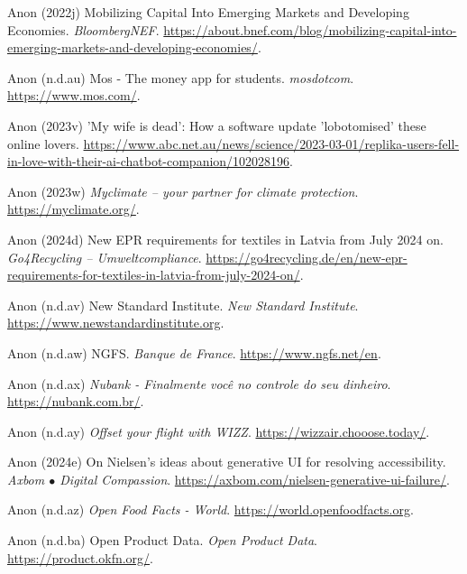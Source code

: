 \documentclass[
  letterpaper,
  DIV=11,
  numbers=noendperiod]{scrartcl}
\newlength{\cslhangindent}
\newenvironment{CSLReferences}[2] %
 {\begin{list}{}{%
  \setlength{\itemindent}{0pt}
  \setlength{\leftmargin}{0pt}
  \setlength{\parsep}{0pt}
  \ifodd #1
   \setlength{\leftmargin}{\cslhangindent}
   \setlength{\itemindent}{-1\cslhangindent}
  \fi
  \setlength{\itemsep}{#2\baselineskip}}}
 {\end{list}}
\begin{document}
\begin{CSLReferences}{0}{1}
Anon (2022j) Mobilizing {Capital Into Emerging Markets} and {Developing
Economies}. \emph{BloombergNEF}.
\url{https://about.bnef.com/blog/mobilizing-capital-into-emerging-markets-and-developing-economies/}.

Anon (n.d.au) Mos - {The} money app for students. \emph{mosdotcom}.
\url{https://www.mos.com/}.

Anon (2023v) '{My} wife is dead': {How} a software update 'lobotomised'
these online lovers.
\url{https://www.abc.net.au/news/science/2023-03-01/replika-users-fell-in-love-with-their-ai-chatbot-companion/102028196}.

Anon (2023w) \emph{Myclimate -- your partner for climate protection}.
\url{https://myclimate.org/}.

Anon (2024d) New {EPR} requirements for textiles in {Latvia} from {July}
2024 on. \emph{Go4Recycling -- Umweltcompliance}.
\url{https://go4recycling.de/en/new-epr-requirements-for-textiles-in-latvia-from-july-2024-on/}.

Anon (n.d.av) New {Standard Institute}. \emph{New Standard Institute}.
\url{https://www.newstandardinstitute.org}.

Anon (n.d.aw) {NGFS}. \emph{Banque de France}.
\url{https://www.ngfs.net/en}.

Anon (n.d.ax) \emph{Nubank - {Finalmente} voc{ê} no controle do seu
dinheiro}. \url{https://nubank.com.br/}.

Anon (n.d.ay) \emph{Offset your flight with {WIZZ}}.
\url{https://wizzair.chooose.today/}.

Anon (2024e) On {Nielsen}'s ideas about generative {UI} for resolving
accessibility. \emph{Axbom {\(\bullet\)} Digital Compassion}.
\url{https://axbom.com/nielsen-generative-ui-failure/}.

Anon (n.d.az) \emph{Open {Food Facts} - {World}}.
\url{https://world.openfoodfacts.org}.

Anon (n.d.ba) Open {Product Data}. \emph{Open Product Data}.
\url{https://product.okfn.org/}.


\end{CSLReferences}
\end{document}
